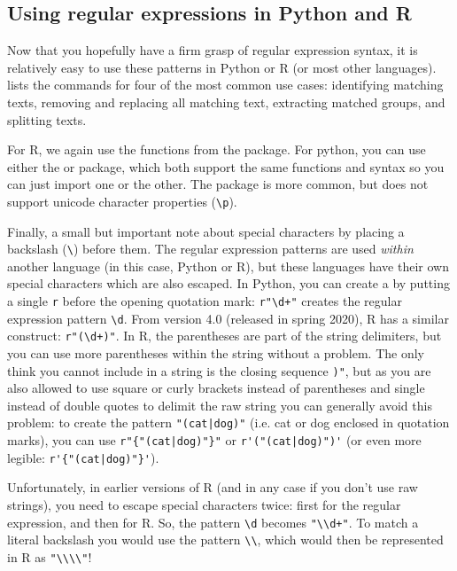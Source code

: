\subsection{Using regular expressions in Python and R}

Now that you hopefully have a firm grasp of regular expression syntax,
it is relatively easy to use these patterns in Python or R (or most other languages).
 lists the commands for four of the most common use cases:
identifying matching texts, removing and replacing all matching text, extracting matched groups, and splitting texts.



For R, we again use the functions from the  package.
For python, you can use either the  or  package,
which both support the same functions and syntax so you can just import one or the other.
The  package is more common, but does not support unicode character properties (\verb!\p!).

Finally, a small but important note about  special characters by placing a backslash (\verb|\|) before them.
The regular expression patterns are used \emph{within} another language (in this case, Python or R), but these languages have their own
special characters which are also escaped. In Python, you can create a  by putting a single \verb|r| before the opening quotation mark:
\verb|r"\d+"| creates the regular expression pattern \verb|\d|.
From version 4.0 (released in spring 2020), R has a similar construct: \verb|r"(\d+)"|. In R, the parentheses are part of the string delimiters, but you can use more parentheses within the string without a problem.
The only think you cannot include in a string is the closing sequence \verb|)"|, but as you are also allowed to use square or curly brackets instead of parentheses and single instead of double quotes to delimit the raw string you can generally avoid this problem:
to create the pattern \verb!"(cat|dog)"! (i.e. cat or dog enclosed in quotation marks), you can use \verb!r"{"(cat|dog)"}"! or \verb!r'("(cat|dog)")'! (or even more legible: \verb!r'{"(cat|dog)"}'!). 

Unfortunately, in earlier versions of R (and in any case if you don't use raw strings), you need to escape special characters twice:
first for the regular expression, and then for R. So, the pattern \verb|\d| becomes \verb|"\\d+"|. To match a literal backslash you would use the pattern \verb|\\|,
which would then be represented in R as \verb|"\\\\"|!



